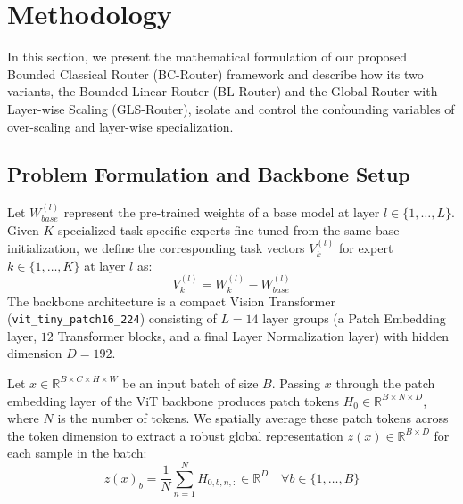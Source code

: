 \section{Methodology}
\label{sec:methodology}

In this section, we present the mathematical formulation of our proposed Bounded Classical Router (BC-Router) framework and describe how its two variants, the Bounded Linear Router (BL-Router) and the Global Router with Layer-wise Scaling (GLS-Router), isolate and control the confounding variables of over-scaling and layer-wise specialization.

\subsection{Problem Formulation and Backbone Setup}
Let $W_{base}^{(l)}$ represent the pre-trained weights of a base model at layer $l \in \{1, \dots, L\}$. Given $K$ specialized task-specific experts fine-tuned from the same base initialization, we define the corresponding task vectors $V_k^{(l)}$ for expert $k \in \{1, \dots, K\}$ at layer $l$ as:
\begin{equation}
    V_k^{(l)} = W_k^{(l)} - W_{base}^{(l)}
\end{equation}
The backbone architecture is a compact Vision Transformer (\texttt{vit\_tiny\_patch16\_224}) consisting of $L=14$ layer groups (a Patch Embedding layer, $12$ Transformer blocks, and a final Layer Normalization layer) with hidden dimension $D=192$. 

Let $x \in \mathbb{R}^{B \times C \times H \times W}$ be an input batch of size $B$. Passing $x$ through the patch embedding layer of the ViT backbone produces patch tokens $H_0 \in \mathbb{R}^{B \times N \times D}$, where $N$ is the number of tokens. We spatially average these patch tokens across the token dimension to extract a robust global representation $z(x) \in \mathbb{R}^{B \times D}$ for each sample in the batch:
\begin{equation}
    z(x)_b = \frac{1}{N} \sum_{n=1}^N H_{0, b, n, :} \in \mathbb{R}^D \quad \forall b \in \{1, \dots, B\}
\end{equation}

